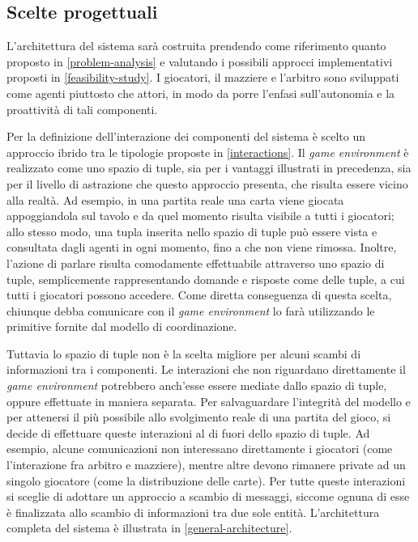 \documentclass[a4paper,12pt]{article}
\begin{document}
\subsection{Scelte progettuali}
L'architettura del sistema sarà costruita prendendo come riferimento quanto proposto in \autoref{problem-analysis} e valutando i possibili approcci implementativi proposti in \autoref{feasibility-study}. I giocatori, il mazziere e l'arbitro sono sviluppati come agenti piuttosto che attori, in modo da porre l'enfasi sull'autonomia e la proattività di tali componenti.

Per la definizione dell'interazione dei componenti del sistema è scelto un approccio ibrido tra le tipologie proposte in \autoref{interactions}. Il \emph{game environment} è realizzato come uno spazio di tuple, sia per i vantaggi illustrati in precedenza, sia per il livello di astrazione che questo approccio presenta, che risulta essere vicino alla realtà. Ad esempio, in una partita reale una carta viene giocata appoggiandola sul tavolo e da quel momento risulta visibile a tutti i giocatori; allo stesso modo, una tupla inserita nello spazio di tuple può essere vista e consultata dagli agenti in ogni momento, fino a che non viene rimossa. Inoltre, l'azione di parlare risulta comodamente effettuabile attraverso uno spazio di tuple, semplicemente rappresentando domande e risposte come delle tuple, a cui tutti i giocatori possono accedere. Come diretta conseguenza di questa scelta, chiunque debba comunicare con il \emph{game environment} lo farà utilizzando le primitive fornite dal modello di coordinazione.

Tuttavia lo spazio di tuple non è la scelta migliore per alcuni scambi di informazioni tra i componenti. Le interazioni che non riguardano direttamente il \emph{game environment} potrebbero anch'esse essere mediate dallo spazio di tuple, oppure effettuate in maniera separata. Per salvaguardare l'integrità del modello e per attenersi il più possibile allo svolgimento reale di una partita del gioco, si decide di effettuare queste interazioni al di fuori dello spazio di tuple. Ad esempio, alcune comunicazioni non interessano direttamente i giocatori (come l'interazione fra arbitro e mazziere), mentre altre devono rimanere private ad un singolo giocatore (come la distribuzione delle carte). Per tutte queste interazioni si sceglie di adottare un approccio a scambio di messaggi, siccome ognuna di esse è finalizzata allo scambio di informazioni tra due sole entità.
L'architettura completa del sistema è illustrata in \autoref{general-architecture}.
\end{document}

